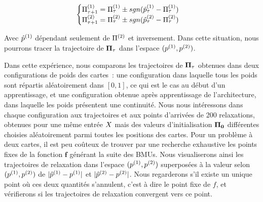 \documentclass[../main]{subfiles}
\begin{document}
\begin{equation*}
	\begin{cases}
	\Pi^{({1})}_{\tau+1} = \Pi^{({1})}_\tau \pm sgn(\hat{p}^{({1})}_\tau - \Pi^{({1})}_\tau)  \\
	\Pi^{({2})}_{\tau+1} = \Pi^{({2})}_\tau \pm sgn(\hat{p}^{({2})}_\tau - \Pi^{({2})}_\tau) \\
	\end{cases}
	\end{equation*}

Avec $\hat{p}^{({1})}$ dépendant seulement de $\Pi^{({2})}$ et inversement. 
Dans cette situation, nous pourrons tracer la trajectoire de $\mathbf{\Pi}_\tau$ dans l'espace $(p^{({1})}, p^{({2})})$.

Dans cette expérience, nous comparons les trajectoires de $\mathbf{\Pi}_\tau$ obtenues dans deux configurations de poids des cartes~: une configuration dans laquelle tous les poids sont répartis aléatoirement dans $[0,1]$, ce qui est le cas au début d'un apprentissage, et une configuration obtenue après apprentissage de l'architecture, dans laquelle les poids présentent une continuité.
Nous nous intéressons dans chaque configuration aux trajectoires et aux points d'arrivées de 200 relaxations, obtenues pour une même entrée $X$ mais des valeurs d'initialisation $\mathbf{\Pi_0}$ différentes choisies aléatoirement parmi toutes les positions des cartes.
Pour un problème à deux cartes, il est peu coûteux de trouver par une recherche exhaustive les points fixes de la fonction $\mathbf{f}$ générant la suite des BMUs.
Nous visualiserons ainsi les trajectoires de relaxation dans l'espace $(p^{({1})},p^{({2})})$ superposées à la valeur selon  $(p^{({1})},p^{({2})})$ de $\lvert \hat{p}^{({1})} - p^{({1})} \rvert$ et $\lvert \hat{p}^{({2})} - p^{({2})}\rvert$. 
Nous regarderons s'il existe un unique point où ces deux quantités s'annulent, c'est à dire le point fixe de $f$, et vérifierons si les trajectoires de relaxation convergent vers ce point.
\end{document}
